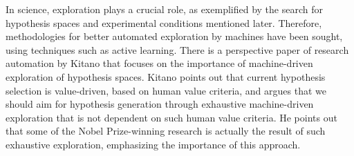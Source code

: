 In science, exploration plays a crucial role, as exemplified by the search for hypothesis spaces and experimental conditions mentioned later. Therefore, methodologies for better automated exploration by machines have been sought, using techniques such as active learning. There is a perspective paper of research automation by Kitano \cite{kitano2021nobel} that focuses on the importance of machine-driven exploration of hypothesis spaces. Kitano points out that current hypothesis selection is value-driven, based on human value criteria, and argues that we should aim for hypothesis generation through exhaustive machine-driven exploration that is not dependent on such human value criteria. He points out that some of the Nobel Prize-winning research is actually the result of such exhaustive exploration, emphasizing the importance of this approach.


